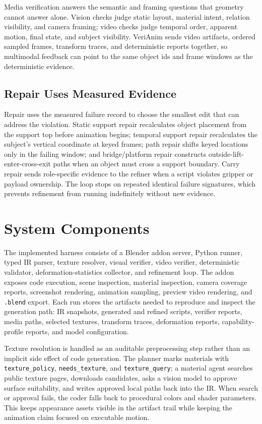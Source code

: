 \documentclass{article}
\newcommand{\code}[1]{\texttt{#1}}
\begin{document}
Media verification answers the semantic and framing questions that geometry cannot answer alone. Vision checks judge static layout, material intent, relation visibility, and camera framing; video checks judge temporal order, apparent motion, final state, and subject visibility. VeriAnim sends video artifacts, ordered sampled frames, transform traces, and deterministic reports together, so multimodal feedback can point to the same object ids and frame windows as the deterministic evidence.

\subsection{Repair Uses Measured Evidence}

Repair uses the measured failure record to choose the smallest edit that can address the violation. Static support repair recalculates object placement from the support top before animation begins; temporal support repair recalculates the subject's vertical coordinate at keyed frames; path repair shifts keyed locations only in the failing window; and bridge/platform repair constructs outside-lift-enter-cross-exit paths when an object must cross a support boundary. Carry repair sends role-specific evidence to the refiner when a script violates gripper or payload ownership. The loop stops on repeated identical failure signatures, which prevents refinement from running indefinitely without new evidence.

\section{System Components}

The implemented harness consists of a Blender addon server, Python runner, typed IR parser, texture resolver, visual verifier, video verifier, deterministic validator, deformation-statistics collector, and refinement loop. The addon exposes code execution, scene inspection, material inspection, camera coverage reports, screenshot rendering, animation sampling, preview video rendering, and \code{.blend} export. Each run stores the artifacts needed to reproduce and inspect the generation path: IR snapshots, generated and refined scripts, verifier reports, media paths, selected textures, transform traces, deformation reports, capability-profile reports, and model configuration.

Texture resolution is handled as an auditable preprocessing step rather than an implicit side effect of code generation. The planner marks materials with \code{texture\_policy}, \code{needs\_texture}, and \code{texture\_query}; a material agent searches public texture pages, downloads candidates, asks a vision model to approve surface suitability, and writes approved local paths back into the IR. When search or approval fails, the coder falls back to procedural colors and shader parameters. This keeps appearance assets visible in the artifact trail while keeping the animation claim focused on executable motion.
\end{document}
